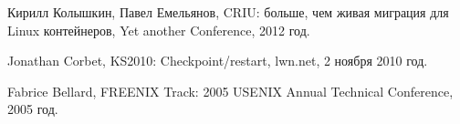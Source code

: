 \begin{thebibliography}{99}

    Кирилл Колышкин, Павел Емельянов, CRIU: больше, чем живая миграция для Linux контейнеров, Yet another Conference, 2012 год.

    Jonathan Corbet, KS2010: Checkpoint/restart, lwn.net, 2 ноября 2010 год.

    Fabrice Bellard, FREENIX Track: 2005 USENIX Annual Technical Conference, 2005 год.

\end{thebibliography}

